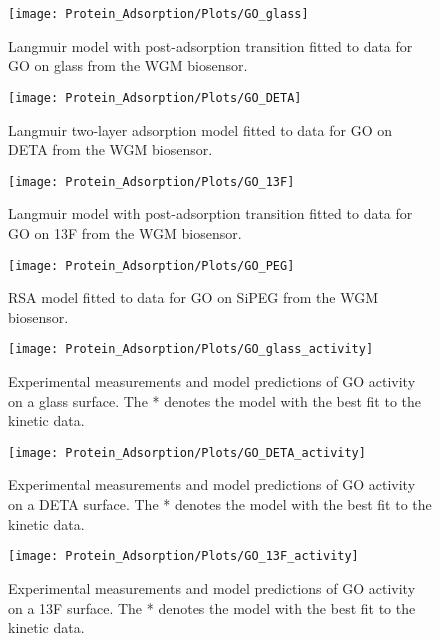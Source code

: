 %
\begin{figure}
\texttt{[image: Protein\_Adsorption/Plots/GO\_glass]}\caption{\label{fig:GO glass plot}Langmuir model with post-adsorption transition
fitted to data for GO on glass from the WGM biosensor.}
%
\end{figure}
%
\begin{figure}
\texttt{[image: Protein\_Adsorption/Plots/GO\_DETA]}

\caption{\label{fig:GO on DETA}Langmuir two-layer adsorption model fitted
to data for GO on DETA from the WGM biosensor.}
%
\end{figure}
%
\begin{figure}
\texttt{[image: Protein\_Adsorption/Plots/GO\_13F]}

\caption{\label{fig:GO on 13F}Langmuir model with post-adsorption transition
fitted to data for GO on 13F from the WGM biosensor.}
%
\end{figure}
%
\begin{figure}
\texttt{[image: Protein\_Adsorption/Plots/GO\_PEG]}

\caption{\label{fig:GO on PEG}RSA model fitted to data for GO on SiPEG from
the WGM biosensor.}
%
\end{figure}
%
\begin{figure}
\texttt{[image: Protein\_Adsorption/Plots/GO\_glass\_activity]}

\caption{\label{fig:GO glass activity}Experimental measurements and model
predictions of GO activity on a glass surface. The {*} denotes the
model with the best fit to the kinetic data.}


%
\end{figure}
%
\begin{figure}
\texttt{[image: Protein\_Adsorption/Plots/GO\_DETA\_activity]}

\caption{\label{fig:GO DETA activity}Experimental measurements and model predictions
of GO activity on a DETA surface. The {*} denotes the model with the
best fit to the kinetic data.}
%
\end{figure}
%
\begin{figure}
\texttt{[image: Protein\_Adsorption/Plots/GO\_13F\_activity]}

\caption{\label{fig:GO 13F activity}Experimental measurements and model predictions
of GO activity on a 13F surface. The {*} denotes the model with the
best fit to the kinetic data.}
%
\end{figure}
%
